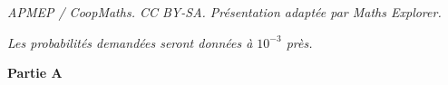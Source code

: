 \documentclass[10pt]{article}
\begin{document}
\noindent\textit{APMEP / CoopMaths. CC BY-SA. Présentation adaptée par Maths Explorer.}\par\medskip
\medskip


\emph{Les probabilités demandées seront données à $10^{-3}$ près.}






















\medskip

\textbf{Partie A}

\medskip
\end{document}
